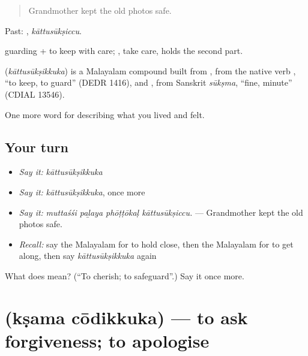 \begin{quote}
Grandmother kept the old photos safe.
\end{quote}

Past: , \emph{kāttusūkṣiccu}.

 guarding +  to keep with care; , take care, holds the second part.

\begin{cousinweb}
\textbf{} (\emph{kāttusūkṣikkuka}) is a Malayalam compound built from , from the native verb , \textquotedblleft{}to keep, to guard\textquotedblright{} (DEDR 1416), and , from Sanskrit \emph{sūkṣma}, \textquotedblleft{}fine, minute\textquotedblright{} (CDIAL 13546).
\end{cousinweb}

\begin{grammarlens}[title={What you've built}]
One more word for describing what you lived and felt.
\end{grammarlens}

\subsection*{Your turn}
\begin{itemize}
\raggedright
  \item \emph{Say it:} \emph{kāttusūkṣikkuka}
  \item \emph{Say it:} \emph{kāttusūkṣikkuka}, once more
  \item \emph{Say it:} \emph{muttaśśi paḻaya phōṭṭōkaḷ kāttusūkṣiccu.} — Grandmother kept the old photos safe.
  \item \emph{Recall:} say the Malayalam for to hold close, then the Malayalam for to get along, then say \emph{kāttusūkṣikkuka} again
\end{itemize}

\begin{tcolorbox}[breakable,colback=teal!4,colframe=teal!35!black,title={Before you move on}]
What does  mean? (\textquotedblleft{}To cherish; to safeguard\textquotedblright{}.) Say it once more.
\end{tcolorbox}
\section[\texorpdfstring{\ml{ക്ഷമ} \ml{ചോദിക്കുക} (kṣama cōdikkuka)}{ക്ഷമ ചോദിക്കുക (kṣama cōdikkuka)}]{  (kṣama cōdikkuka) — to ask forgiveness; to apologise}

